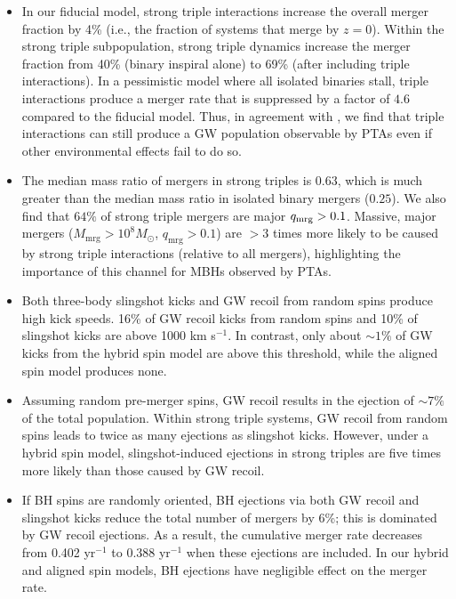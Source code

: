 \documentclass[twocolumn,linenumbers]{aastex701}
\newcommand{\kms}{km s$^{-1}$}
\begin{document}
\begin{itemize}

    \item In our fiducial model,  strong triple interactions increase the overall merger fraction by 4\% (i.e., the fraction of systems that merge by $z=0$). Within the strong triple subpopulation, strong triple dynamics increase the merger fraction from 40\% (binary inspiral alone) to 69\% (after including triple interactions). In a pessimistic model where all isolated binaries stall, triple interactions produce a merger rate that is suppressed by a factor of $4.6$ compared to the fiducial model. Thus, in agreement with \citet{bonetti_post-newtonian_2018}, we find that triple interactions can still produce a GW population observable by PTAs even if other environmental effects fail to do so.

    
    \item The median mass ratio of mergers in strong triples is $0.63$, which is much greater than the median mass ratio in isolated binary mergers  ($0.25$). We also find that $64\%$ of strong triple mergers are major $q_{\rm mrg} > 0.1$. Massive, major mergers ($M_{\text{mrg}} > 10^{8} M_{\odot}$, $q_{\text{mrg}} >0.1$) are $> 3$ times more likely to be caused by strong triple interactions (relative to all mergers), highlighting the importance of this channel for MBHs observed by PTAs.

    \item Both three-body slingshot kicks and GW recoil from random spins produce high kick speeds. 16\% of GW recoil kicks from random spins and 10\% of slingshot kicks are above 1000 \kms. In contrast, only about $\sim 1\%$ of GW kicks from the hybrid spin model are above this threshold, while the aligned spin model produces none.

    \item Assuming random pre-merger spins, GW recoil results in the ejection of $\sim 7 \%$ of the total population. Within strong triple systems, GW recoil from random spins leads to twice as many ejections as slingshot kicks. However, under a hybrid spin model, slingshot-induced ejections in strong triples are five times more likely than those caused by GW recoil.

    \item If BH spins are randomly oriented, BH ejections via both GW recoil and slingshot kicks reduce the total number of mergers by 6\%; this is dominated by GW recoil ejections. As a result, the cumulative merger rate decreases from 0.402 yr$^{-1}$ to 0.388 yr$^{-1}$ when these ejections are included. In our hybrid and aligned spin models, BH ejections have negligible effect on the merger rate.

\end{itemize}
\end{document}
